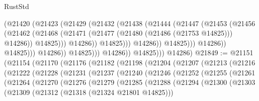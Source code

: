 \begin{lexlean}{RustStd}
\begin{coremodule}
                                        (@21420
                                          (@21423
                                            (@21429
                                              (@21432
                                                (@21438
                                                  (@21444
                                                    (@21447
                                                      (@21453
                                                        (@21456
                                                          (@21462
                                                            (@21468
                                                              (@21471
                                                                (@21477
                                                                  (@21480 (@21486 (@21753 @14825)))
                                                                  @14286))
                                                              @14825)))
                                                        @14286))
                                                    @14825)))
                                              @14286))
                                          @14825)))
                                    @14286))
                                @14825)))
                          @14286))
                      @14825)))
                @14286))
            @14825)))
      @14286)
@21849 := @21151
    (@21154
      (@21170
        (@21176
          (@21182
            (@21198
              (@21204
                (@21207
                  (@21213
                    (@21216
                      (@21222
                        (@21228
                          (@21231
                            (@21237
                              (@21240
                                (@21246
                                  (@21252
                                    (@21255
                                      (@21261
                                        (@21264
                                          (@21270
                                            (@21276
                                              (@21279
                                                (@21285
                                                  (@21288
                                                    (@21294
                                                      (@21300
                                                        (@21303
                                                          (@21309
                                                            (@21312 (@21318 (@21324 @21801 @14825)))

\end{coremodule}
\end{lexlean}
